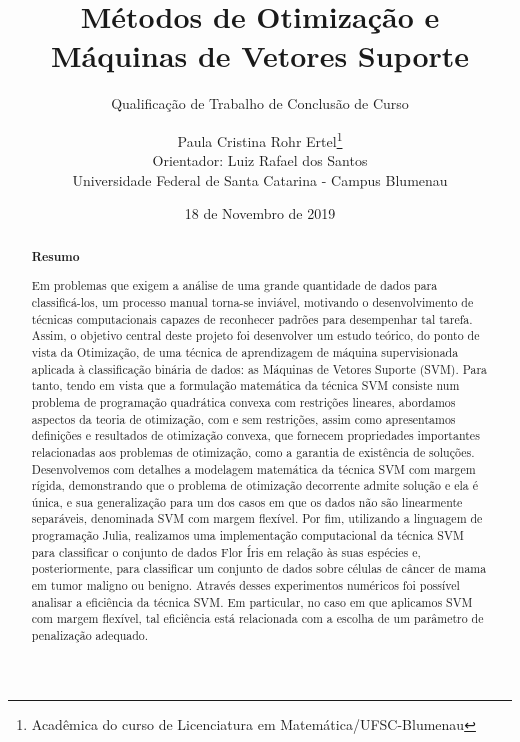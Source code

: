 \documentclass[12pt,a4paper]{scrartcl}
\theoremstyle{definition}%
\begin{document}
\title{Métodos de Otimização e Máquinas de Vetores Suporte} 
\author{ \normalfont Paula Cristina Rohr Ertel\thanks{Acadêmica do curso de Licenciatura em Matemática/UFSC-Blumenau} \\ \small Orientador: Luiz Rafael dos Santos \\ \small Universidade Federal de Santa Catarina - Campus Blumenau}
\date{\small 18 de Novembro de 2019}
\subtitle{Qualificação de Trabalho de Conclusão de Curso}
\maketitle

\begin{abstract}

\begin{center}
\textbf{Resumo}
\end{center}

Em problemas que exigem a análise de uma grande quantidade de dados para classificá-los, um processo manual torna-se inviável, motivando o desenvolvimento de técnicas computacionais capazes de reconhecer padrões para desempenhar tal tarefa. Assim, o objetivo central deste projeto foi desenvolver um estudo teórico, do ponto de vista da Otimização, de uma técnica de aprendizagem de máquina supervisionada aplicada à classificação binária de dados: as Máquinas de Vetores Suporte (SVM). Para tanto, tendo em vista que a formulação matemática da técnica SVM consiste num problema de programação quadrática convexa com restrições lineares, abordamos aspectos da teoria de otimização, com e sem restrições, assim como apresentamos definições e resultados de otimização convexa, que fornecem propriedades importantes relacionadas aos problemas de otimização, como a garantia de existência de soluções. Desenvolvemos com detalhes a modelagem matemática da técnica SVM com margem rígida, demonstrando que o problema de otimização decorrente admite solução e ela é única, e sua generalização para um dos casos em que os dados não são linearmente separáveis, denominada SVM com margem flexível. Por fim, utilizando a linguagem de programação Julia, realizamos uma implementação computacional da técnica SVM para classificar o conjunto de dados Flor Íris em relação às suas espécies e, posteriormente, para classificar um conjunto de dados sobre células de câncer de mama em tumor maligno ou benigno. Através desses experimentos numéricos foi possível analisar a eficiência da técnica SVM. Em particular, no caso em que aplicamos SVM com margem flexível, tal eficiência está relacionada com a escolha de um parâmetro de penalização adequado.





\end{abstract}
\end{document}
